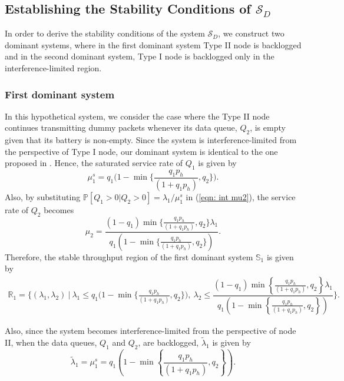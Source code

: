 \documentclass[draftcls,12pt,onecolumn]{IEEEtran}
\begin{document}
\subsection{Establishing the Stability Conditions of $\mathcal{S}_D$} \label{subsec: conditions}
In order to derive the stability conditions of the system $\mathcal{S}_D$, we construct two dominant systems, where in the first dominant system Type II node is backlogged and in the second dominant system, Type I node is backlogged only in the interference-limited region. \subsubsection{First dominant system}
\indent In this hypothetical system, we consider the case where the Type II node continues transmitting dummy packets whenever its data queue, $Q_2$, is empty given that its battery is non-empty. Since the system is interference-limited from the perspective of Type I node, our dominant system is identical to the one proposed in \cite{rao1988stability}. Hence, the saturated service rate of $Q_1$ is given by
\begin{equation}
\mu_1^s = q_1 \big( 1- \min \big\lbrace \frac{q_1 p_h}{ (1+ q_1 p_h)}, q_2 \big\rbrace \big). 
\end{equation}
Also, by substituting $\mathbb{P}[Q_1 >0 | Q_2 >0] =\lambda_1 / \mu_1^s$ in (\ref{eqn: int mu2}), the service rate of $Q_2$ becomes
\begin{equation}
\mu_2 = \dfrac{(1-q_1) \min \big\lbrace \frac{q_1 p_h}{ (1+ q_1 p_h)}, q_2 \big\rbrace \lambda_1}{q_1 \left( 1- \min \big\lbrace \frac{q_1 p_h}{ (1+ q_1 p_h)}, q_2 \big\rbrace \right)}.
\end{equation}
Therefore, the stable throughput region of the first dominant system $ \mathbb{S}_1$ is given by 
\begin{align}\label{eqn: S1}
\mathbb{R}_1 = \bigg\{ (\lambda_1, \lambda_2) \ \big| \ \lambda_1 \leq q_1 \big( 1- \min \big\lbrace \frac{q_1 p_h}{ (1+ q_1 p_h)}, q_2 \big\rbrace \big), \ \lambda_2 \leq  \dfrac{(1-q_1) \min \left\lbrace \frac{q_1 p_h}{ (1+ q_1 p_h)}, q_2 \right\rbrace \lambda_1}{q_1 \left( 1- \min \left\lbrace \frac{q_1 p_h}{ (1+ q_1 p_h)}, q_2 \right\rbrace \right)}  \bigg\}. 
\end{align}

Also, since the system becomes interference-limited from the perspective of node II, when the data queues, $Q_1$ and $Q_2$, are backlogged, $\tilde{\lambda}_1$ is given by 
\begin{equation}
\tilde{\lambda}_1 = \mu_1^s = q_1 \left( 1- \min \left\lbrace \frac{q_1 p_h}{ (1+ q_1 p_h)}, q_2 \right\rbrace \right). 
\end{equation}
\end{document}
